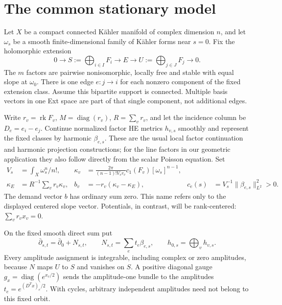\documentclass[11pt]{amsart}
\theoremstyle{definition}
\theoremstyle{remark}
\newcommand{\db}{\bar\partial}
\newcommand{\rk}{\operatorname{rk}}
\newcommand{\diag}{\operatorname{diag}}
\begin{document}
\section{The common stationary model}\label{sec02:stationary}

Let \(X\) be a compact connected Kähler manifold of complex
dimension \(n\), and let
\(\omega_s\) be a smooth finite-dimensional family of Kähler forms
near \(s=0\). Fix the holomorphic extension
\begin{equation}\label{eq02:extension}
 0\longrightarrow S:=\bigoplus_{i\in I}F_i
 \longrightarrow E\longrightarrow U:=\bigoplus_{j\in J}F_j
 \longrightarrow0.
\end{equation}
The \(m\) factors are pairwise nonisomorphic, locally free and stable
with equal slope at \(\omega_0\). There is one edge \(e:j\to i\)
for each nonzero component of the fixed extension class. Assume this
bipartite support is connected. Multiple basis vectors in one Ext
space are part of that single component, not additional edges.

Write \(r_v=\rk F_v\), \(M=\diag(r_v)\), \(R=\sum_vr_v\),
and let the incidence column be \(D_e=e_i-e_j\). Continue normalized
factor HE metrics \(h_{v,s}\) smoothly and represent the fixed
classes by harmonic \(\beta_{e,s}\). These are the usual local
factor continuation and harmonic projection constructions; for the
line factors in our geometric application they also follow directly
from the scalar Poisson equation. Set
\begin{equation}\label{eq02:normalization}
 \begin{aligned}
 V_s&=\int_X\omega_s^n/n!,&
 \kappa_v&=\frac{2\pi}{(n-1)!V_sr_v}
                  c_1(F_v)[\omega_s]^{n-1},\\
 \kappa_E&=R^{-1}\sum_vr_v\kappa_v,&
 b_v&=-r_v(\kappa_v-\kappa_E),&
 c_e(s)&=V_s^{-1}\|\beta_{e,s}\|_{L^2}^2>0.
 \end{aligned}
\end{equation}
The demand vector \(b\) has ordinary sum zero. This name refers
only to the displayed centered slope vector. Potentials, in contrast,
will be rank-centered: \(\sum_vr_vx_v=0\).

On the fixed smooth direct sum put
\begin{equation}\label{eq02:amplitude}
 \db_{s,t}=\db_0+N_{s,t},\qquad
 N_{s,t}=\sum_et_e\beta_{e,s},\qquad h_{0,s}=\bigoplus_vh_{v,s}.
\end{equation}
Every amplitude assignment is integrable, including complex or zero
amplitudes, because \(N\) maps \(U\) to \(S\) and vanishes on
\(S\). A positive diagonal gauge \(g_x=\diag(e^{x_v/2})\) sends
the amplitude-one bundle to the amplitudes
\(t_e=e^{(D^Tx)_e/2}\). With cycles, arbitrary independent amplitudes
need not belong to this fixed orbit.
\end{document}
